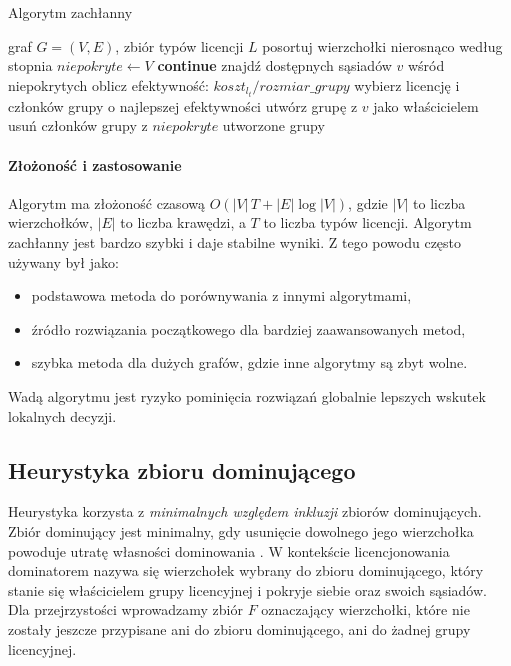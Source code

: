 \begin{algorithm}[H]
  \caption{Algorytm zachłanny}
  \label{alg:greedy}
  \begin{algorithmic}[1]
    \Require graf $G=(V,E)$, zbiór typów licencji $L$
    \State posortuj wierzchołki nierosnąco według stopnia
    \State $niepokryte \gets V$
     \textbf{continue} \EndIf
    \State znajdź dostępnych sąsiadów $v$ wśród niepokrytych
    \State oblicz efektywność: $koszt_{l_t} / rozmiar\_grupy$
    \EndFor
    \State wybierz licencję i członków grupy o najlepszej efektywności
    \State utwórz grupę z $v$ jako właścicielem
    \State usuń członków grupy z $niepokryte$
    \EndFor
    \State \Return utworzone grupy
  \end{algorithmic}
\end{algorithm}


\paragraph{Złożoność i zastosowanie}
Algorytm ma złożoność czasową $O(|V|\,T + |E|\log |V|)$, gdzie $|V|$ to liczba wierzchołków, $|E|$ to liczba krawędzi, a $T$ to liczba typów licencji.
Algorytm zachłanny jest bardzo szybki i daje stabilne wyniki. Z tego powodu często używany był jako:
\begin{itemize}
  \item podstawowa metoda do porównywania z innymi algorytmami,
  \item źródło rozwiązania początkowego dla bardziej zaawansowanych metod,
  \item szybka metoda dla dużych grafów, gdzie inne algorytmy są zbyt wolne.
\end{itemize}
Wadą algorytmu jest ryzyko pominięcia rozwiązań globalnie lepszych wskutek lokalnych decyzji.
\subsection{Heurystyka zbioru dominującego}\label{subsec:ds}

Heurystyka korzysta z \emph{minimalnych względem inkluzji} zbiorów dominujących. Zbiór dominujący jest minimalny, gdy usunięcie dowolnego jego wierzchołka powoduje utratę własności dominowania \cite{haynes1998domination}. W kontekście licencjonowania dominatorem nazywa się wierzchołek wybrany do zbioru dominującego, który stanie się właścicielem grupy licencyjnej i pokryje siebie oraz swoich sąsiadów. Dla przejrzystości wprowadzamy zbiór $F$ oznaczający wierzchołki, które nie zostały jeszcze przypisane ani do zbioru dominującego, ani do żadnej grupy licencyjnej.

